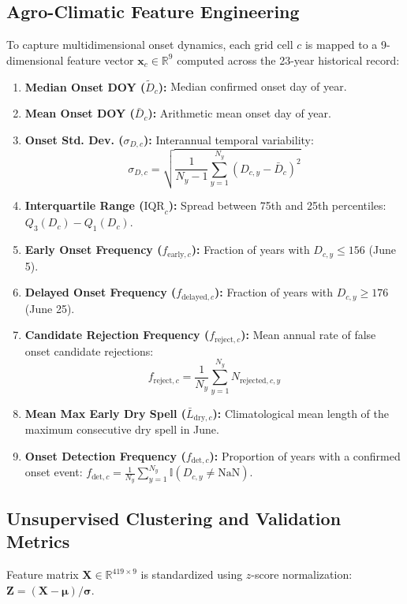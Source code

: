 \documentclass[conference]{IEEEtran}
\begin{document}
\subsection{Agro-Climatic Feature Engineering}
To capture multidimensional onset dynamics, each grid cell $c$ is mapped to a 9-dimensional feature vector $\mathbf{x}_c \in \mathbb{R}^9$ computed across the 23-year historical record:
\begin{enumerate}
    \item \textbf{Median Onset DOY ($\tilde{D}_c$):} Median confirmed onset day of year.
    \item \textbf{Mean Onset DOY ($\bar{D}_c$):} Arithmetic mean onset day of year.
    \item \textbf{Onset Std. Dev. ($\sigma_{D,c}$):} Interannual temporal variability:
    \begin{equation}
    \sigma_{D,c} = \sqrt{\frac{1}{N_{y}-1}\sum_{y=1}^{N_y} (D_{c,y} - \bar{D}_c)^2}
    \end{equation}
    \item \textbf{Interquartile Range ($\text{IQR}_c$):} Spread between 75th and 25th percentiles: $Q_3(D_c) - Q_1(D_c)$.
    \item \textbf{Early Onset Frequency ($f_{\mathrm{early},c}$):} Fraction of years with $D_{c,y} \le 156$ (June 5).
    \item \textbf{Delayed Onset Frequency ($f_{\mathrm{delayed},c}$):} Fraction of years with $D_{c,y} \ge 176$ (June 25).
    \item \textbf{Candidate Rejection Frequency ($f_{\mathrm{reject},c}$):} Mean annual rate of false onset candidate rejections:
    \begin{equation}
    f_{\mathrm{reject},c} = \frac{1}{N_y} \sum_{y=1}^{N_y} N_{\mathrm{rejected},c,y}
    \end{equation}
    \item \textbf{Mean Max Early Dry Spell ($\bar{L}_{\mathrm{dry},c}$):} Climatological mean length of the maximum consecutive dry spell in June.
    \item \textbf{Onset Detection Frequency ($f_{\mathrm{det},c}$):} Proportion of years with a confirmed onset event: $f_{\mathrm{det},c} = \frac{1}{N_y}\sum_{y=1}^{N_y} \mathbb{I}(D_{c,y} \neq \text{NaN})$.
\end{enumerate}

\subsection{Unsupervised Clustering and Validation Metrics}
Feature matrix $\mathbf{X} \in \mathbb{R}^{419 \times 9}$ is standardized using $z$-score normalization: $\mathbf{Z} = (\mathbf{X} - \boldsymbol{\mu}) / \boldsymbol{\sigma}$.
\end{document}
